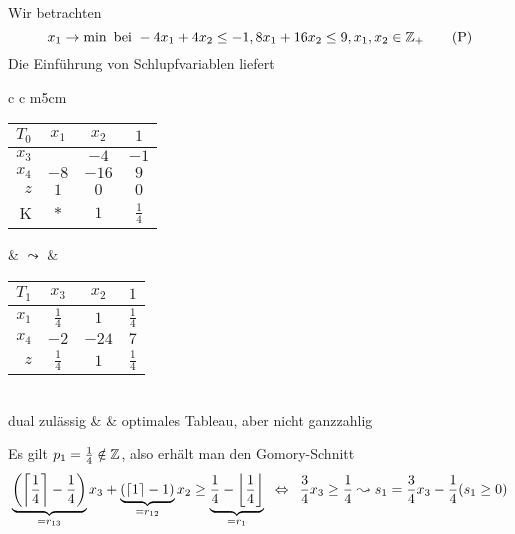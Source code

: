 \begin{beispiel}
	\label{beispiel: 4.6}
	Wir betrachten
	\begin{equation*}
		x_1 \to \min \text{ bei } -4x_1 + 4x_2 \le -1 , 8x_1 + 16x_2 \le 9, x_1, x_2 \in \mathbb{Z}_+ 
		\tag{P} \label{eq: 4.6-p}
	\end{equation*}
	Die Einführung von Schlupfvariablen liefert
	\begin{center}
		\begin{tabular}{c c m{5cm}}
			\begin{tabular}{r|cc|c}
				$T_0$ & $x_1$ & $x_2$ & $1$ \\ \hline
				$x_3$ & \fbox{$4$} & $-4$ & $-1$ \\
				$x_4$ & $-8$ & $-16$ & $9$ \\ \hline
				$z$ & $1$ & $0$ & $0$ \\ \hline
				K & $\ast$ & $1$ & $\frac{1}{4}$
			\end{tabular}
			& $\leadsto$ &
			\begin{tabular}{r|cc|c}
				$T_1$ & $x_3$ & $x_2$ & $1$ \\ \hline
				$x_1$ & $\frac{1}{4}$ & $1$ & $\frac{1}{4}$ \\
				$x_4$ & $-2$ & $-24$ & $7$ \\ \hline
				$z$ & $\frac{1}{4}$ & $1$ & $\frac{1}{4}$ \\
			\end{tabular} 
			\\
			dual zulässig
			& &
			optimales Tableau, aber nicht ganzzahlig	
		\end{tabular}
	\end{center}

	Es gilt $p_1 = \frac{1}{4} \notin \mathbb{Z}$, also erhält man den Gomory-Schnitt
	\begin{equation*}
			\underbrace{\left( \left\lceil \frac{1}{4} \right\rceil - \frac{1}{4} \right)}_{=r_{13}} x_3 + \underbrace{\left( \left\lceil 1 \right\rceil - 1 \right)}_{= r_{12}} x_2 \ge \underbrace{\frac{1}{4} - \left\lfloor \frac{1}{4} \right\rfloor}_{=r_1}
			\enskip \Leftrightarrow \enskip \frac{3}{4} x_3 \ge \frac{1}{4} \leadsto s_1 = \frac{3}{4} x_3 - \frac{1}{4} (s_1 \ge 0)
	\end{equation*}
	

\end{beispiel}
